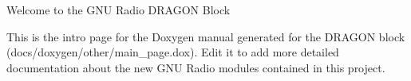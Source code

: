 Welcome to the G\+NU Radio D\+R\+A\+G\+ON Block

This is the intro page for the Doxygen manual generated for the D\+R\+A\+G\+ON block (docs/doxygen/other/main\+\_\+page.\+dox). Edit it to add more detailed documentation about the new G\+NU Radio modules contained in this project. 
